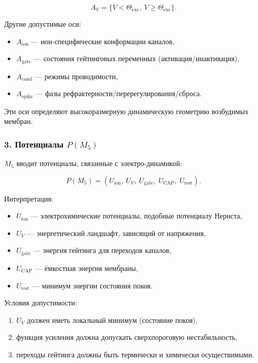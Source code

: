 \[
A_V = \{ V < \Theta_{\mathrm{exc}},\ V \ge \Theta_{\mathrm{exc}} \}.
\]

Другие допустимые оси:

\begin{itemize}
    \item $A_{\mathrm{ion}}$ — ион-специфические конформации каналов,
    \item $A_{\mathrm{gate}}$ — состояния гейтинговых переменных (активация/инактивация),
    \item $A_{\mathrm{cond}}$ — режимы проводимости,
    \item $A_{\mathrm{spike}}$ — фазы рефрактерности/перерегулирования/сброса.
\end{itemize}

Эти оси определяют высокоразмерную динамическую геометрию возбудимых мембран.

\subsubsection*{3. Потенциалы \texorpdfstring{$P(M_5)$}{P(M_5)}}

$M_5$ вводит потенциалы, связанные с электро-динамикой:

\[
P(M_5) =
(U_{\mathrm{ion}},\ U_V,\ U_{\mathrm{gate}},\
U_{\mathrm{CAP}},\ U_{\mathrm{rest}}).
\]

Интерпретация:

\begin{itemize}
    \item $U_{\mathrm{ion}}$ — электрохимические потенциалы, подобные потенциалу Нернста,
    \item $U_V$ — энергетический ландшафт, зависящий от напряжения,
    \item $U_{\mathrm{gate}}$ — энергия гейтинга для переходов каналов,
    \item $U_{\mathrm{CAP}}$ — ёмкостная энергия мембраны,
    \item $U_{\mathrm{rest}}$ — минимум энергии состояния покоя.
\end{itemize}

Условия допустимости:

\begin{enumerate}
    \item $U_V$ должен иметь локальный минимум (состояние покоя),
    \item функция усиления должна допускать сверхпороговую нестабильность,
    \item переходы гейтинга должны быть термически и химически осуществимыми.
\end{enumerate}


